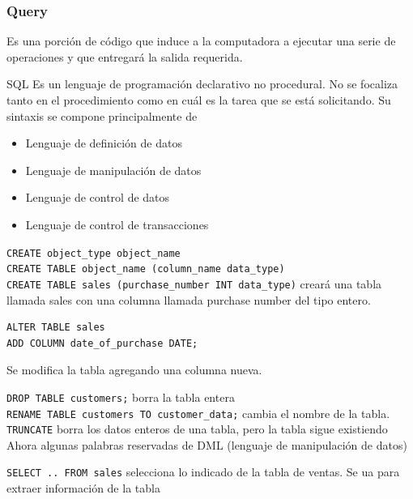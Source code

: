 \subsubsection{Query}

Es una porción de código que induce a la computadora a ejecutar una serie de operaciones y que entregará la salida requerida.


SQL Es un lenguaje de programación declarativo no procedural. No se focaliza tanto en el procedimiento como en cuál es la tarea que se está solicitando. Su sintaxis se compone principalmente de 

\begin{itemize}
    \item Lenguaje de definición de datos
    \item Lenguaje de manipulación de datos
    \item Lenguaje de control de datos
    \item Lenguaje de control de transacciones
\end{itemize}

\texttt{CREATE object\_type object\_name} \\

\texttt{CREATE TABLE object\_name (column\_name data\_type)} \\


\texttt{CREATE TABLE sales (purchase\_number INT data\_type)} creará una tabla llamada sales con una columna llamada purchase number del tipo entero.

\begin{verbatim}
ALTER TABLE sales
ADD COLUMN date_of_purchase DATE;
\end{verbatim}

Se modifica la tabla agregando una columna nueva.

\texttt{DROP TABLE customers;} borra la tabla entera \\


\texttt{RENAME TABLE customers TO customer\_data;} cambia el nombre de la tabla. \\

\texttt{TRUNCATE} borra los datos enteros de una tabla, pero la tabla sigue existiendo \\

Ahora algunas palabras reservadas de DML (lenguaje de manipulación de datos)

\texttt{SELECT .. FROM sales} selecciona lo indicado de la tabla de ventas. Se ua para extraer información de la tabla


